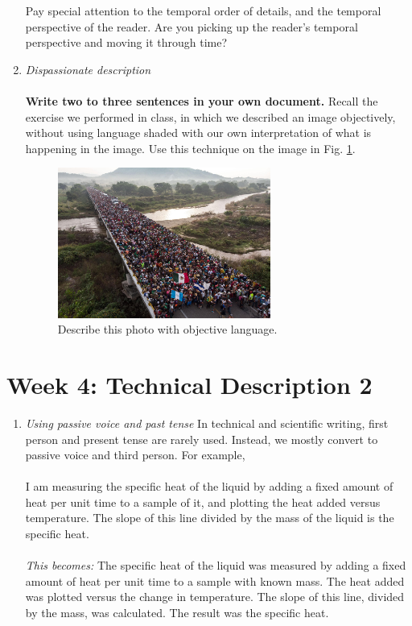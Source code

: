 \documentclass{article}
\begin{document}
\begin{enumerate}
\begin{itemize}
\end{itemize}
Pay special attention to the temporal order of details, and the temporal perspective of the reader.  Are you picking up the reader's temporal perspective and moving it through time?
\item \textit{Dispassionate description} \\ \\
\textbf{Write two to three sentences in your own document.}  Recall the exercise we performed in class, in which we described an image objectively, without using language shaded with our own interpretation of what is happening in the image.  Use this technique on the image in Fig. \ref{fig:caravan}.

\begin{figure}
\centering
\includegraphics[width=7cm]{figures/caravan.jpg}
\caption{\label{fig:caravan} Describe this photo with objective language.}
\end{figure}
\end{enumerate}

\section{Week 4: Technical Description 2}

\begin{enumerate}
\item \textit{Using passive voice and past tense} In technical and scientific writing, first person and present tense are rarely used.  Instead, we mostly convert to passive voice and third person.  For example, \\ \\
I am measuring the specific heat of the liquid by adding a fixed amount of heat per unit time to a sample of it, and plotting the heat added versus temperature.  The slope of this line divided by the mass of the liquid is the specific heat. \\ \\
\textit{This becomes:} The specific heat of the liquid was measured by adding a fixed amount of heat per unit time to a sample with known mass.  The heat added was plotted versus the change in temperature.  The slope of this line, divided by the mass, was calculated.  The result was the specific heat.
\end{enumerate}
\end{document}
